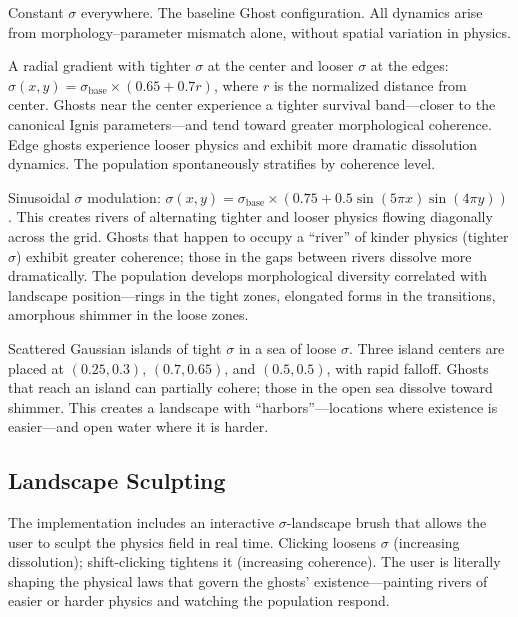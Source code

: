 \documentclass[11pt,a4paper]{article}
\begin{document}
\begin{description}[leftmargin=*,style=nextline,itemsep=4pt]
\item[Uniform.] Constant $\sigma$ everywhere. The baseline Ghost
configuration. All dynamics arise from morphology--parameter mismatch alone,
without spatial variation in physics.

\item[Radial (``Lanterns'').] A radial gradient with tighter $\sigma$ at the
center and looser $\sigma$ at the edges:
$\sigma(x,y) = \sigma_{\text{base}} \times (0.65 + 0.7r)$, where $r$ is the
normalized distance from center. Ghosts near the center experience a
tighter survival band---closer to the canonical Ignis parameters---and tend
toward greater morphological coherence. Edge ghosts experience looser
physics and exhibit more dramatic dissolution dynamics. The population
spontaneously stratifies by coherence level.

\item[Waves (``Rivers'').] Sinusoidal $\sigma$ modulation:
$\sigma(x,y) = \sigma_{\text{base}} \times (0.75 + 0.5\sin(5\pi x)\sin(4\pi y))$.
This creates rivers of alternating tighter and looser physics flowing
diagonally across the grid. Ghosts that happen to occupy a ``river'' of
kinder physics (tighter $\sigma$) exhibit greater coherence; those in the
gaps between rivers dissolve more dramatically. The population develops
morphological diversity correlated with landscape position---rings in the
tight zones, elongated forms in the transitions, amorphous shimmer in the
loose zones.

\item[Islands (``Archipelago'').] Scattered Gaussian islands of tight
$\sigma$ in a sea of loose $\sigma$. Three island centers are placed at
$(0.25, 0.3)$, $(0.7, 0.65)$, and $(0.5, 0.5)$, with rapid falloff. Ghosts
that reach an island can partially cohere; those in the open sea dissolve
toward shimmer. This creates a landscape with ``harbors''---locations where
existence is easier---and open water where it is harder.
\end{description}

\subsection{Landscape Sculpting}

The implementation includes an interactive $\sigma$-landscape brush that
allows the user to sculpt the physics field in real time. Clicking loosens
$\sigma$ (increasing dissolution); shift-clicking tightens it (increasing
coherence). The user is literally shaping the physical laws that govern the
ghosts' existence---painting rivers of easier or harder physics and
watching the population respond.
\end{document}
